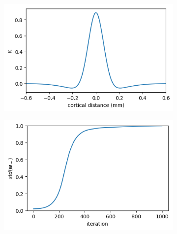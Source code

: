 \documentclass{article}
\begin{document}
\begin{figure}[h]
	\centering
	\begin{subfigure}[t]{0.35\linewidth}
		\centering
		\includegraphics[width = 1.0\linewidth, trim={5 5 7 9}, clip=true]{figures/plot_K.png}
		\label{fig:plotK}	
	\end{subfigure}%
	\hspace{0.1\linewidth}
	\begin{subfigure}[t]{0.35\linewidth}
		\centering
		\includegraphics[width = 1.0\linewidth, trim={5 5 7 9}, clip=true]{figures/occsimtemp_stds.png}
		\label{fig:stds}	
	\end{subfigure}%
\caption{}
\label{}
\end{figure}
\end{document}
